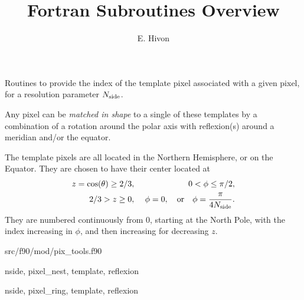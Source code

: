 
\sloppy


\title{\healpix Fortran Subroutines Overview}
 \section[template\_pixel\_nest, template\_pixel\_ring]{ }
\label{sub:template_pixel_xxx}
\author{E. Hivon}

\begin{facility}
{Routines to provide the index of the template pixel associated with a given
  \healpix pixel, for a resolution parameter ${N_{\rm side}}$. 

Any pixel can be {\em matched in shape}
  to a single of these templates by a combination of  a rotation around the polar axis with 
  reflexion(s) around a meridian and/or the equator. 

The template pixels are all located in the Northern Hemisphere, or on the
 Equator.
They are chosen to have their center located at
\begin{eqnarray}
     z=\cos(\theta)\ge 2/3,  &\ &    0< \phi \leq \pi/2,   \nonumber\\            %
     2/3 > z \geq 0,  &\ & \phi=0, \quad{\rm or}\quad  \phi=\frac{\pi}{4\nside}.  \nonumber %
\myhtmlimage{}
\end{eqnarray}
 They are numbered continuously from 0, starting at the North Pole, with the index
 increasing in $\phi$, and then increasing for decreasing $z$.
}
{src/f90/mod/pix\_tools.f90}
\end{facility}

\begin{f90format}
{nside, pixel\_nest, template, reflexion}
\end{f90format}
\begin{f90format}
{nside, pixel\_ring, template, reflexion}
\end{f90format}

